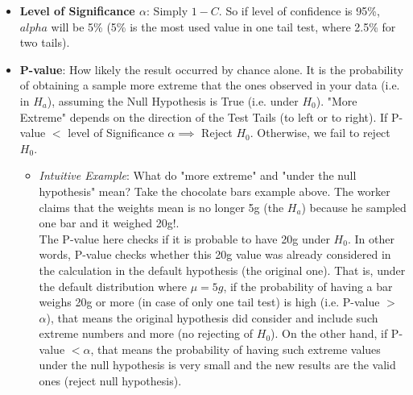 \documentclass[11pt, twocolumn]{article}
\begin{document}
\begin{itemize}
\item \textbf{Level of Significance  $\alpha$}: Simply $1 - C$. So if level of confidence is 95\%, $alpha$ will be 5\% (5\% is the most used value in one tail test, where 2.5\% for two tails).

\item \textbf{P-value}: How likely the result occurred by {\color{blue}chance} alone. It is the {\color{blue}probability} of obtaining a sample {\color{blue}more extreme} that the ones observed in your data (i.e. in $H_a$), assuming the Null Hypothesis is {\color{blue}True} (i.e. {\color{blue}under $H_0$}).
"More Extreme" depends on the direction of the Test Tails (to left or to right). If P-value $<$ level of Significance $\alpha \implies$ Reject $H_0$. Otherwise, we fail to reject $H_0$. 

\begin{itemize}
\item \textit{Intuitive Example}:
What do "more extreme" and "under the null hypothesis" mean? 
Take the chocolate bars example above. The worker claims that the weights mean is no longer 5g (the $H_a$) because he sampled one bar and it weighed 20g!.\\
The P-value here checks if it is probable to have 20g {\color{blue}under $H_0$}. In other words, P-value checks whether this 20g value {\color{blue}was already considered} in the calculation in the default hypothesis (the original one). That is, {\color{red} under the default distribution where $\mu = 5g$}, if the probability of having a bar weighs 20g or {\color{blue}more} (in case of only one tail test) is {\color{blue}high} (i.e. P-value $>$ $\alpha$), that means the original hypothesis {\color{blue}did consider and include} such extreme numbers and {\color{blue}more} (no rejecting of $H_0$).
On the other hand, if P-value $< \alpha$, that means the probability of having such extreme values under the null hypothesis is {\color{blue}very small} and the new results are the valid ones (reject null hypothesis).
\end{itemize}

\end{itemize}
\end{document}
